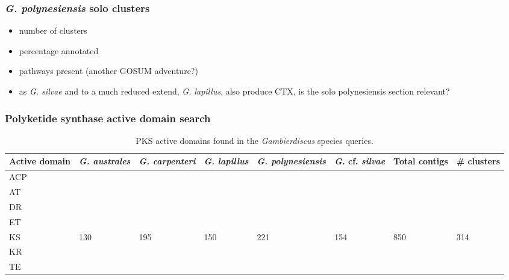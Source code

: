 \documentclass[12pt]{article}
\begin{document}
\subsubsection*{\textit{G. polynesiensis} solo clusters}
\begin{itemize}
\item number of clusters
\item percentage annotated
\item pathways present (another GOSUM adventure?)
\item as \textit{G. silvae} and to a much reduced extend, \textit{G. lapillus}, also produce CTX, is the solo polynesiensis section relevant?
\end{itemize}


\subsubsection*{Polyketide synthase active domain search}

\begin{table}
\caption{PKS active domains found in the \emph{Gambierdiscus} species queries.}
\label{tbl:PKSTable}
\begin{tabular}{ | p{1.65cm} | p{1.5cm} | p{1.5cm} | p{1.5cm} | p{1.7cm} | p{1.5cm}| p{1.5cm}| p{1.5cm}|}
\hline
\textbf{Active domain}& \textit{G. australes}& \emph{G. carpenteri}&\emph{G. lapillus}&\emph{G. polynesiensis}&\emph{G.} cf. \emph{silvae}&\textbf{Total contigs}&\textbf{\# clusters}\\
\hline
ACP&&&&&&&\\
\hline
AT&&&&&&&\\
\hline
DR&&&&&&&\\
\hline
ET&&&&&&&\\
\hline
KS&130&195&150&221&154&850&314\\
\hline
KR&&&&&&&\\
\hline
TE&&&&&&&\\
\hline
\end{tabular}
\end{table}
\FloatBarrier
\end{document}
